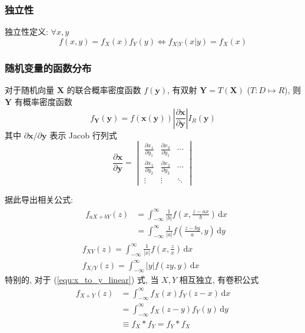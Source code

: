 \documentclass[11pt,a4paper,twocolumn]{article} %
\numberwithin{equation}{section} %
\renewcommand*{\vec}[1]{\bm{#1}} %
\newcommand{\dif}{\,\mathrm d}
\begin{document}
\subsubsection{独立性} %
\label{ssub:indenpendency}
独立性定义: $\forall x, y$ 
\begin{equation}
	f(x,y) = f_X(x)f_Y(y) \Leftrightarrow f_{X|Y}(x|y) = f_X(x)
\end{equation}
\subsubsection{随机变量的函数分布} %
\label{ssub:func_dist}
对于随机向量 $\vec X$ 的联合概率密度函数 $f(\vec y)$, 
有双射 $\vec Y = T(\vec X)$ ($T:D\mapsto R$), 则 $\vec Y$ 有概率密度函数
\begin{equation}
	f_{\vec Y}(\vec y) = f(\vec x(\vec y)) 
	\left|\frac{\partial \vec x}{\partial \vec y}\right| I_R(\vec y)
\end{equation}
其中 $\partial \vec x/\partial \vec y$ 表示 Jacob 行列式
\begin{equation}
	\frac{\partial \vec x}{\partial \vec y} = \begin{vmatrix}
		\frac{\partial x_1}{\partial y_1} & \frac{\partial x_2}{\partial y_1} 
		& \cdots \\
		\frac{\partial x_1}{\partial y_2} & \frac{\partial x_2}{\partial y_2}
		& \cdots \\
		\vdots & \vdots & \ddots
	\end{vmatrix}
\end{equation}

据此导出相关公式: 
\begin{align}
	&\begin{aligned}
		f_{aX + bY}(z) &= \int_{-\infty}^{\infty}\frac{1}{|b|}
		f\left(x, \frac{z-ax}{b}\right)\dif x \\
		&= \int_{-\infty}^{\infty}\frac{1}{|a|}
		f\left(\frac{z-by}{a}, y\right)\dif y
	\end{aligned}\label{equ:x_to_y_linear}\\
	&f_{XY}(z) = \int_{-\infty}^{\infty}\frac{1}{|x|}
	f\left(x, \frac zx\right)\dif x \\
	&f_{X/Y}(z) = \int_{-\infty}^{\infty}|y|f(zy, y)\dif x
\end{align}
特别的, 对于 (\ref{equ:x_to_y_linear}) 式, 当 $X, Y$ 相互独立, 有卷积公式
\begin{equation}
\begin{split}
	f_{X+Y}(z) &= \int_{-\infty}^{\infty}f_X(x)f_Y(z-x)\dif x \\
	&= \int_{-\infty}^{\infty} f_X(z-y)f_Y(y)\dif y \\
	&\equiv f_X * f_Y = f_Y * f_X
\end{split}
\end{equation}
\end{document}
